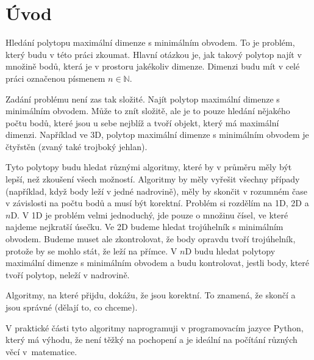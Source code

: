 \chapter*{Úvod}

Hledání polytopu maximální dimenze s minimálním obvodem. To je problém, který budu v této práci zkoumat. Hlavní otázkou je, jak takový polytop najít v množině bodů, která je v prostoru jakékoliv dimenze. Dimenzi budu mít v celé práci označenou písmenem $n \in \mathbb{N}$.

Zadání problému není zas tak složité. Najít polytop maximální dimenze s minimálním obvodem. Může to znít složitě, ale je to pouze hledání nějakého počtu bodů, které jsou u sebe  nejblíž a tvoří objekt, který má maximální dimenzi. Například ve 3D, polytop maximální dimenze s minimálním obvodem je čtyřstěn (zvaný také trojboký jehlan). 

Tyto polytopy budu hledat různými algoritmy, které by v průměru měly být lepší, než zkoušení všech možností. Algoritmy by měly vyřešit všechny případy (například, když body leží v jedné nadrovině), měly by skončit v rozumném čase v závislosti na počtu bodů a musí být korektní. Problém si rozdělím na 1D, 2D a $n$D. V 1D je problém velmi jednoduchý, jde pouze o množinu čísel, ve které najdeme nejkratší úsečku. Ve 2D budeme hledat trojúhelník s minimálním obvodem. Budeme muset ale zkontrolovat, že body opravdu tvoří trojúhelník, protože by se mohlo stát, že leží na přímce. V $n$D budu hledat polytopy maximální dimenze s minimálním obvodem a budu kontrolovat, jestli body, které tvoří polytop, neleží v nadrovině. 

Algoritmy, na které přijdu, dokážu, že jsou korektní. To znamená, že skončí a jsou správné (dělají to, co chceme).

V praktické části tyto algoritmy naprogramuji v programovacím jazyce Python, který má výhodu, že není těžký na pochopení a je ideální na počítání různých věcí v~matematice. 